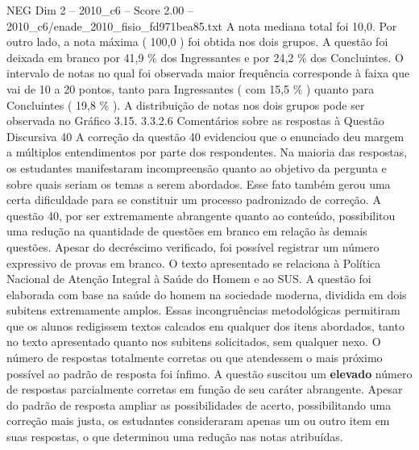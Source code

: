\begin{textsample}{NEG Dim 2 – 2010\_c6 – Score 2.00 – 2010\_c6/enade\_2010\_fisio\_fd971bea85.txt}
A nota mediana total foi 10,0.
Por outro lado, a nota máxima ( 100,0 ) foi obtida nos dois grupos.
A questão foi deixada em branco por 41,9 \% dos Ingressantes e por 24,2 \% dos Concluintes.
O intervalo de notas no qual foi observada maior frequência corresponde à faixa que vai de 10 a 20 pontos, tanto para Ingressantes ( com 15,5 \% ) quanto para Concluintes ( 19,8 \% ).
A distribuição de notas nos dois grupos pode ser observada no Gráfico 3.15. 3.3.2.6 Comentários sobre as respostas à Questão Discursiva 40 A correção da questão 40 evidenciou que o enunciado deu margem a múltiplos entendimentos por parte dos respondentes.
Na maioria das respostas, os estudantes manifestaram incompreensão quanto ao objetivo da pergunta e sobre quais seriam os temas a serem abordados.
Esse fato também gerou uma certa dificuldade para se constituir um processo padronizado de correção.
A questão 40, por ser extremamente abrangente quanto ao conteúdo, possibilitou uma redução na quantidade de questões em branco em relação às demais questões.
Apesar do decréscimo verificado, foi possível registrar um número expressivo de provas em branco.
O texto apresentado se relaciona à Política Nacional de Atenção Integral à Saúde do Homem e ao SUS.
A questão foi elaborada com base na saúde do homem na sociedade moderna, dividida em dois subitens extremamente amplos.
Essas incongruências metodológicas permitiram que os alunos redigissem textos calcados em qualquer dos itens abordados, tanto no texto apresentado quanto nos subitens solicitados, sem qualquer nexo.
O número de respostas totalmente corretas ou que atendessem o mais próximo possível ao padrão de resposta foi ínfimo.
A questão suscitou um \textbf{elevado} número de respostas parcialmente corretas em função de seu caráter abrangente.
Apesar do padrão de resposta ampliar as possibilidades de acerto, possibilitando uma correção mais justa, os estudantes consideraram apenas um ou outro item em suas respostas, o que determinou uma redução nas notas atribuídas.

\end{textsample}
